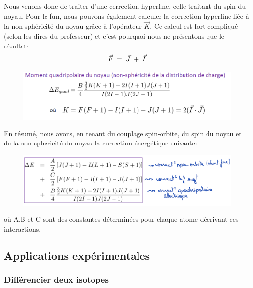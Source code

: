 Nous venons donc de traiter d'une correction hyperfine, celle traitant du spin du noyau. Pour le fun, nous pouvons également calculer la correction hyperfine liée à la non-sphéricité du noyau grâce à l'opérateur $\vec{K}$. Ce calcul est fort compliqué (selon les dires du professeur) et c'est pourquoi nous ne présentons que le résultat:
\[
    \vec{F} \; = \; \vec{J} \; + \; \vec{I}
\]
\begin{figure}[tph]
    \centering
    \includegraphics[scale=0.80]{Images2/CorrecK.PNG}
    \label{eq:correcK}
\end{figure}
En résumé, nous avons, en tenant du couplage spin-orbite, du spin du noyau et de la non-sphéricité du noyau la correction énergétique suivante:
\begin{figure}[tph]
    \centering
    \includegraphics[scale=0.80]{Images2/résuméCorrec.PNG}
    \label{eq:résuméCorrec}
\end{figure}
où A,B et C sont des constantes déterminées pour chaque atome décrivant ces interactions.



\subsection{Applications expérimentales}
\subsubsection{Différencier deux isotopes}



